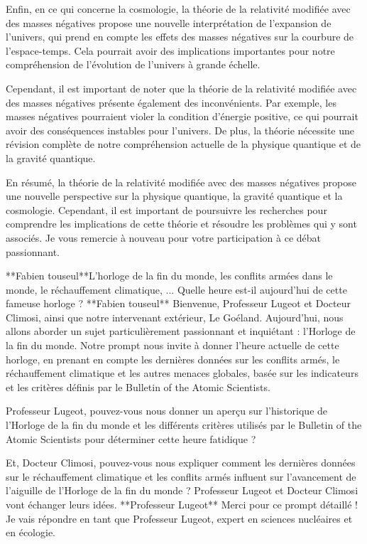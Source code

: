 Enfin, en ce qui concerne la cosmologie, la théorie de la relativité modifiée avec des masses négatives propose une nouvelle interprétation de l'expansion de l'univers, qui prend en compte les effets des masses négatives sur la courbure de l'espace-temps. Cela pourrait avoir des implications importantes pour notre compréhension de l'évolution de l'univers à grande échelle.

Cependant, il est important de noter que la théorie de la relativité modifiée avec des masses négatives présente également des inconvénients. Par exemple, les masses négatives pourraient violer la condition d'énergie positive, ce qui pourrait avoir des conséquences instables pour l'univers. De plus, la théorie nécessite une révision complète de notre compréhension actuelle de la physique quantique et de la gravité quantique.

En résumé, la théorie de la relativité modifiée avec des masses négatives propose une nouvelle perspective sur la physique quantique, la gravité quantique et la cosmologie. Cependant, il est important de poursuivre les recherches pour comprendre les implications de cette théorie et résoudre les problèmes qui y sont associés. Je vous remercie à nouveau pour votre participation à ce débat passionnant.

**Fabien touseul**L'horloge de la fin du monde, les conflits armées dans le monde, le réchauffement climatique, ... Quelle heure est-il aujourd'hui de cette fameuse horloge ?
**Fabien touseul**
Bienvenue, Professeur Lugeot et Docteur Climosi, ainsi que notre intervenant extérieur, Le Goéland. Aujourd'hui, nous allons aborder un sujet particulièrement passionnant et inquiétant : l'Horloge de la fin du monde. Notre prompt nous invite à donner l'heure actuelle de cette horloge, en prenant en compte les dernières données sur les conflits armés, le réchauffement climatique et les autres menaces globales, basée sur les indicateurs et les critères définis par le Bulletin of the Atomic Scientists.

Professeur Lugeot, pouvez-vous nous donner un aperçu sur l'historique de l'Horloge de la fin du monde et les différents critères utilisés par le Bulletin of the Atomic Scientists pour déterminer cette heure fatidique ?

Et, Docteur Climosi, pouvez-vous nous expliquer comment les dernières données sur le réchauffement climatique et les conflits armés influent sur l'avancement de l'aiguille de l'Horloge de la fin du monde ?
Professeur Lugeot et Docteur Climosi vont échanger leurs idées.
**Professeur Lugeot**
Merci pour ce prompt détaillé ! Je vais répondre en tant que Professeur Lugeot, expert en sciences nucléaires et en écologie.

